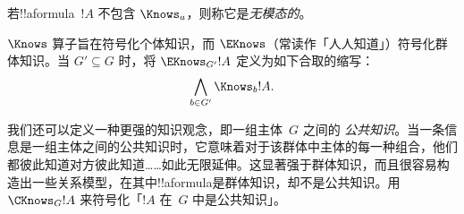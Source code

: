 \documentclass[../../../include/open-logic-section]{subfiles}
\begin{document}
若!!a{formula}~$!A$ 不包含 $\Knows_a$，则称它是\emph{无模态的}。

\begin{defn}
  $\Knows$ 算子旨在符号化个体知识，而 $\EKnows$（常读作「人人知道」）符号化群体知识。当 $G' \subseteq G$ 时，将 $\EKnows_{G'} !A$
 定义为如下合取的缩写：\[\bigwedge_{b \in G'} \Knows_b !A.\]
\end{defn}

我们还可以定义一种更强的知识观念，即一组主体~$G$ 之间的
\emph{公共知识}。当一条信息是一组主体之间的公共知识时，它意味着对于该群体中主体的每一种组合，他们都彼此知道对方彼此知道……如此无限延伸。这显著强于群体知识，而且很容易构造出一些关系模型，在其中!!a{formula}是群体知识，却不是公共知识。用 $\CKnows_G !A$ 来符号化「$!A$ 在~$G$ 中是公共知识」。
\end{document}
